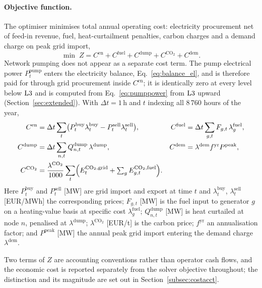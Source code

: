 \paragraph{Objective function.}
The optimiser minimises total annual operating cost: electricity procurement net of
feed-in revenue, fuel, heat-curtailment penalties, carbon charges and a demand charge on
peak grid import,
%
\begin{equation}
  \min \; Z = C^{\mathrm{en}} + C^{\mathrm{fuel}}
    + C^{\mathrm{dump}} + C^{\mathrm{CO_2}} + C^{\mathrm{dem}} .
  \label{eq:objective}
\end{equation}
%
Network pumping does not appear as a separate cost term. The pump electrical power
$P_t^{\mathrm{pump}}$ enters the electricity balance, Eq.~\eqref{eq:balance_el}, and is
therefore paid for through grid procurement inside $C^{\mathrm{en}}$; it is identically
zero at every level below $\mathrm{L3}$ and is computed from Eq.~\eqref{eq:pumppower} from
$\mathrm{L3}$ upward (Section~\ref{sec:extended}). With $\Delta t = 1$\,h and $t$ indexing all
8\,760 hours of the year,
%
\begin{align*}
C^{\mathrm{en}}   &= \Delta t \sum_t
  \bigl(P_t^{\mathrm{buy}} \lambda_t^{\mathrm{buy}}
        - P_t^{\mathrm{sell}} \lambda_t^{\mathrm{sell}}\bigr), &
C^{\mathrm{fuel}} &= \Delta t \sum_{g,t}
  F_{g,t}\, \lambda_g^{\mathrm{fuel}}, \\
C^{\mathrm{dump}} &= \Delta t \sum_{n,t}
  Q_{n,t}^{\mathrm{dump}}\, \lambda^{\mathrm{dump}}, &
C^{\mathrm{dem}}  &= \lambda^{\mathrm{dem}} f^{\mathrm{yr}}
  P^{\mathrm{peak}}, \\
C^{\mathrm{CO_2}} &= \frac{\lambda^{\mathrm{CO_2}}}{1000} \sum_t
  \Bigl(E_t^{\mathrm{CO_2,grid}} +
        \textstyle\sum_g E_{g,t}^{\mathrm{CO_2,fuel}}\Bigr). &&
\end{align*}
%
Here $P_t^{\mathrm{buy}}$ and $P_t^{\mathrm{sell}}$ [MW] are grid import and export at
time $t$ and $\lambda_t^{\mathrm{buy}}$, $\lambda_t^{\mathrm{sell}}$ [EUR/MWh] the
corresponding prices; $F_{g,t}$ [MW] is the fuel input to generator $g$ on a
heating-value basis at specific cost $\lambda_g^{\mathrm{fuel}}$;
$Q_{n,t}^{\mathrm{dump}}$ [MW] is heat curtailed at node $n$, penalised at
$\lambda^{\mathrm{dump}}$; $\lambda^{\mathrm{CO_2}}$ [EUR/t] is the carbon price;
$f^{\mathrm{yr}}$ an annualisation factor; and $P^{\mathrm{peak}}$ [MW] the annual peak
grid import entering the demand charge $\lambda^{\mathrm{dem}}$.

Two terms of $Z$ are accounting conventions rather than operator cash flows, and the
economic cost is reported separately from the solver objective throughout; the
distinction and its magnitude are set out in Section~\ref{subsec:costacct}.

